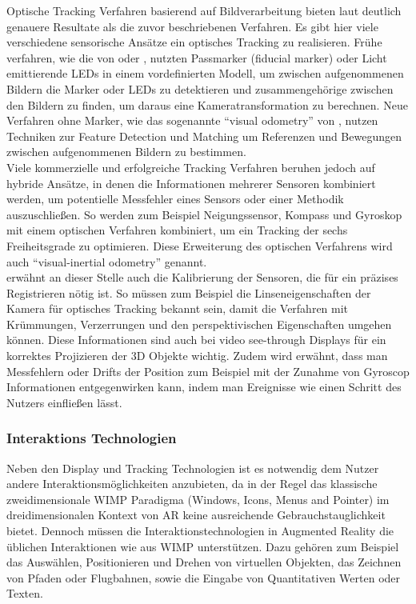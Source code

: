 Optische Tracking Verfahren basierend auf Bildverarbeitung bieten laut \citet{van2010survey} deutlich genauere Resultate als die zuvor beschriebenen Verfahren. Es gibt hier viele verschiedene sensorische Ansätze ein optisches Tracking zu realisieren. Frühe verfahren, wie die von \citet{dunston2008identification} oder \citet{narzt2006augmented}, nutzten Passmarker (fiducial marker) oder Licht emittierende LEDs in einem vordefinierten Modell, um zwischen aufgenommenen Bildern die Marker oder LEDs zu detektieren und zusammengehörige zwischen den Bildern zu finden, um daraus eine Kameratransformation zu berechnen. Neue Verfahren ohne Marker, wie das sogenannte \enquote{visual odometry} von \citet{nister2004visual}, nutzen Techniken zur Feature Detection und Matching um Referenzen und Bewegungen zwischen aufgenommenen Bildern zu bestimmen.\\

Viele kommerzielle und erfolgreiche Tracking Verfahren beruhen jedoch auf hybride Ansätze, in denen die Informationen mehrerer Sensoren kombiniert werden, um potentielle Messfehler eines Sensors oder einer Methodik auszuschließen. So werden zum Beispiel Neigungssensor, Kompass und Gyroskop mit einem optischen Verfahren kombiniert, um ein Tracking der sechs Freiheitsgrade zu optimieren. Diese Erweiterung des optischen Verfahrens wird auch \enquote{visual-inertial odometry} genannt. \citep{van2010survey}\\

\citet{azuma2001recent} erwähnt an dieser Stelle auch die Kalibrierung der Sensoren, die für ein präzises Registrieren nötig ist. So müssen zum Beispiel die Linseneigenschaften der Kamera für optisches Tracking bekannt sein, damit die Verfahren mit Krümmungen, Verzerrungen und den perspektivischen Eigenschaften umgehen können. Diese Informationen sind auch bei video see-through Displays für ein korrektes Projizieren der 3D Objekte wichtig. Zudem wird erwähnt, dass man Messfehlern oder Drifts der Position zum Beispiel mit der Zunahme von Gyroscop Informationen entgegenwirken kann, indem man Ereignisse wie einen Schritt des Nutzers einfließen lässt. \citep{azuma2001recent} \\

\subsubsection{Interaktions Technologien} \label{sec:ar-interaction}

Neben den Display und Tracking Technologien ist es notwendig dem Nutzer andere Interaktionsmöglichkeiten anzubieten, da in der Regel das klassische zweidimensionale WIMP Paradigma (Windows, Icons, Menus and Pointer) im dreidimensionalen Kontext von AR keine ausreichende Gebrauchstauglichkeit bietet. Dennoch müssen die Interaktionstechnologien in Augmented Reality die üblichen Interaktionen wie aus WIMP unterstützen. Dazu gehören zum Beispiel das Auswählen, Positionieren und Drehen von virtuellen Objekten, das Zeichnen von Pfaden oder Flugbahnen, sowie die Eingabe von Quantitativen Werten oder Texten. \citep{van2010survey} \\

